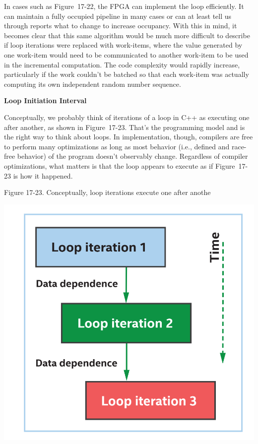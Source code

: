 In cases such as Figure 17-22, the FPGA can implement the loop efficiently. It can maintain a fully occupied pipeline in many cases or can at least tell us through reports what to change to increase occupancy. With this in mind, it becomes clear that this same algorithm would be much more difficult to describe if loop iterations were replaced with work-items, where the value generated by one work-item would need to be communicated to another work-item to be used in the incremental computation. The code complexity would rapidly increase, particularly if the work couldn’t be batched so that each work-item was actually computing its own independent random number sequence.\par

\hspace*{\fill} \par %
\textbf{Loop Initiation Interval}

Conceptually, we probably think of iterations of a loop in C++ as executing one after another, as shown in Figure 17-23. That’s the programming model and is the right way to think about loops. In implementation, though, compilers are free to perform many optimizations as long as most behavior (i.e., defined and race-free behavior) of the program doesn’t observably change. Regardless of compiler optimizations, what matters is that the loop appears to execute as if Figure 17-23 is how it happened.\par

\hspace*{\fill} \par %
Figure 17-23. Conceptually, loop iterations execute one after anothe
\begin{center}
	\includegraphics[width=1.0\textwidth]{content/chapter-17/images/18}
\end{center}

